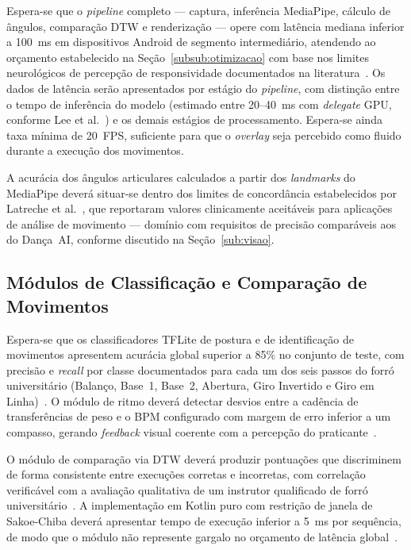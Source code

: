 Espera-se que o \textit{pipeline} completo --- captura, inferência MediaPipe, cálculo de
ângulos, comparação DTW e renderização --- opere com latência mediana inferior a 100~ms em
dispositivos Android de segmento intermediário, atendendo ao orçamento estabelecido na
Seção~\ref{subsub:otimizacao} com base nos limites neurológicos de percepção de
responsividade documentados na literatura~\cite{plos_feedback_delay}. Os dados de latência
serão apresentados por estágio do \textit{pipeline}, com distinção entre o tempo de
inferência do modelo (estimado entre 20--40~ms com \textit{delegate} GPU, conforme Lee et
al.~\cite{lee2019ondevice}) e os demais estágios de processamento. Espera-se ainda taxa
mínima de 20~FPS, suficiente para que o \textit{overlay} seja percebido como fluido durante a
execução dos movimentos.

A acurácia dos ângulos articulares calculados a partir dos \textit{landmarks} do MediaPipe
deverá situar-se dentro dos limites de concordância estabelecidos por Latreche et
al.~\cite{LATRECHE2023112826}, que reportaram valores clinicamente aceitáveis para aplicações
de análise de movimento --- domínio com requisitos de precisão comparáveis aos do Dança~AI,
conforme discutido na Seção~\ref{sub:visao}.

\subsection{Módulos de Classificação e Comparação de Movimentos}
\label{sub:res_dtw}

Espera-se que os classificadores TFLite de postura e de identificação de movimentos
apresentem acurácia global superior a 85\% no conjunto de teste, com precisão e
\textit{recall} por classe documentados para cada um dos seis passos do forró universitário
(Balanço, Base~1, Base~2, Abertura, Giro Invertido e Giro em
Linha)~\cite{roggio2024pose, bursa2023tflite}. O módulo de ritmo deverá detectar desvios
entre a cadência de transferências de peso e o BPM configurado com margem de erro inferior a
um compasso, gerando \textit{feedback} visual coerente com a percepção do
praticante~\cite{rose2019metronome}.

O módulo de comparação via DTW deverá produzir pontuações que discriminem de forma
consistente entre execuções corretas e incorretas, com correlação verificável com a avaliação
qualitativa de um instrutor qualificado de forró universitário~\cite{dynamic_dance_warping}. A
implementação em Kotlin puro com restrição de janela de Sakoe-Chiba deverá apresentar tempo
de execução inferior a 5~ms por sequência, de modo que o módulo não represente gargalo no
orçamento de latência global~\cite{skeleton_dtw_sport}.

